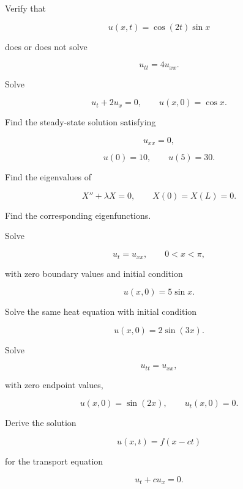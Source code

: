 \begin{exercise}[2]
Verify that

\[
u(x,t)
=
\cos(2t)\sin x
\]

does or does not solve

\[
u_{tt}=4u_{xx}.
\]
\end{exercise}

\begin{exercise}[2]
Solve

\[
u_t+2u_x=0,
\qquad
u(x,0)=\cos x.
\]
\end{exercise}

\begin{exercise}[2]
Find the steady-state solution satisfying

\[
u_{xx}=0,
\]

\[
u(0)=10,
\qquad
u(5)=30.
\]
\end{exercise}

\begin{exercise}[2]
Find the eigenvalues of

\[
X''+\lambda X=0,
\qquad
X(0)=X(L)=0.
\]
\end{exercise}

\begin{exercise}[2]
Find the corresponding eigenfunctions.
\end{exercise}

\begin{exercise}[2]
Solve

\[
u_t=u_{xx},
\qquad
0<x<\pi,
\]

with zero boundary values and initial condition

\[
u(x,0)=5\sin x.
\]
\end{exercise}

\begin{exercise}[2]
Solve the same heat equation with initial condition

\[
u(x,0)=2\sin(3x).
\]
\end{exercise}

\begin{exercise}[2]
Solve

\[
u_{tt}=u_{xx},
\]

with zero endpoint values,

\[
u(x,0)=\sin(2x),
\qquad
u_t(x,0)=0.
\]
\end{exercise}

\begin{exercise}[3]
Derive the solution

\[
u(x,t)=f(x-ct)
\]

for the transport equation

\[
u_t+cu_x=0.
\]
\end{exercise}

